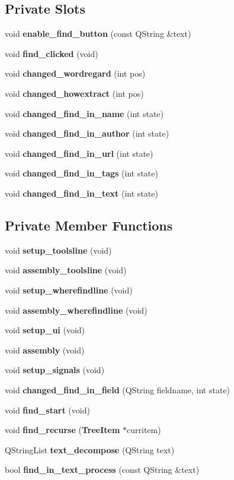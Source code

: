 \subsection*{Private Slots}
\begin{CompactItemize}
\item 
void {\bf enable\_\-find\_\-button} (const QString \&text)
\item 
void {\bf find\_\-clicked} (void)
\item 
void {\bf changed\_\-wordregard} (int pos)
\item 
void {\bf changed\_\-howextract} (int pos)
\item 
void {\bf changed\_\-find\_\-in\_\-name} (int state)
\item 
void {\bf changed\_\-find\_\-in\_\-author} (int state)
\item 
void {\bf changed\_\-find\_\-in\_\-url} (int state)
\item 
void {\bf changed\_\-find\_\-in\_\-tags} (int state)
\item 
void {\bf changed\_\-find\_\-in\_\-text} (int state)
\end{CompactItemize}
\subsection*{Private Member Functions}
\begin{CompactItemize}
\item 
void {\bf setup\_\-toolsline} (void)
\item 
void {\bf assembly\_\-toolsline} (void)
\item 
void {\bf setup\_\-wherefindline} (void)
\item 
void {\bf assembly\_\-wherefindline} (void)
\item 
void {\bf setup\_\-ui} (void)
\item 
void {\bf assembly} (void)
\item 
void {\bf setup\_\-signals} (void)
\item 
void {\bf changed\_\-find\_\-in\_\-field} (QString fieldname, int state)
\item 
void {\bf find\_\-start} (void)
\item 
void {\bf find\_\-recurse} ({\bf Tree\-Item} $\ast$curritem)
\item 
QString\-List {\bf text\_\-decompose} (QString text)
\item 
bool {\bf find\_\-in\_\-text\_\-process} (const QString \&text)
\end{CompactItemize}
